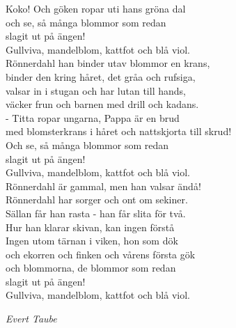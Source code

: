 \documentclass[a6paper,10pt]{article}
\begin{document}
Koko! Och göken ropar uti hans gröna dal\\
och se, så många blommor som redan \\
slagit ut på ängen!\\
Gullviva, mandelblom, kattfot och blå viol.
\vspace{5pt}\\
Rönnerdahl han binder utav blommor en krans,\\
binder den kring håret, det gråa och rufsiga,\\
valsar in i stugan och har lutan till hands,\\
väcker frun och barnen med drill och kadans.
\vspace{5pt}\\
- Titta ropar ungarna, Pappa är en brud\\
med blomsterkrans i håret och nattskjorta till skrud!\\
Och se, så många blommor som redan \\
slagit ut på ängen!\\
Gullviva, mandelblom, kattfot och blå viol.
\vspace{5pt}\\
Rönnerdahl är gammal, men han valsar ändå!\\
Rönnerdahl har sorger och ont om sekiner.\\
Sällan får han rasta - han får slita för två.\\
Hur han klarar skivan, kan ingen förstå
\vspace{5pt}\\
Ingen utom tärnan i viken, hon som dök\\
och ekorren och finken och vårens första gök\\
och blommorna, de blommor som redan \\
slagit ut på ängen!\\
Gullviva, mandelblom, kattfot och blå viol. 
\begin{flushright}
\textit{Evert Taube}
\end{flushright}
\end{document}
